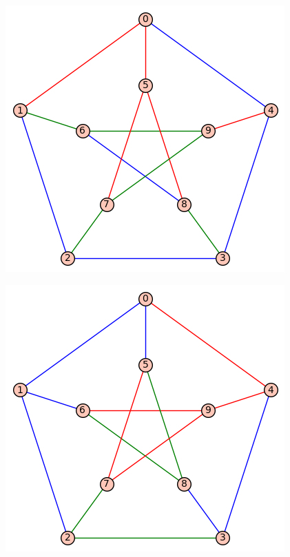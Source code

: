 \documentclass[12pt, a4paper]{article}
\begin{document}
\begin{figure}[H]
\centering
\begin{minipage}{.5\textwidth}
  \centering
  \includegraphics[width=.8\linewidth]{petersen_pred.png}
  \label{fig:naključno pobarvan Petersenov graf}
\end{minipage}%
\begin{minipage}{.5\textwidth}
  \centering
  \includegraphics[width=.8\linewidth]{petersen_po.png}
  \label{fig:lokalno iregularno pobarvan $Petersenov$ $graf$}
\end{minipage}
\end{figure}
\end{document}
